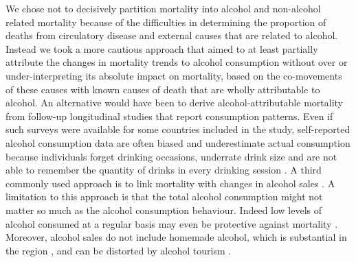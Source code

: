 \documentclass{article}
\begin{document}
\begin{spacing}{1.5}
We chose not to decisively partition mortality into alcohol and non-alcohol related mortality because of the difficulties in determining the proportion of deaths from circulatory disease and external causes that are related to alcohol. Instead we took a more cautious approach that aimed to at least partially attribute the changes in mortality trends to alcohol consumption without over or under-interpreting its absolute impact on mortality, based on the co-movements of these causes with known causes of death that are wholly attributable to alcohol. An alternative would have been to derive alcohol-attributable mortality from follow-up longitudinal studies that report consumption patterns. Even if such surveys were available for some countries included in the study, self-reported alcohol consumption data are often biased and underestimate actual consumption because individuals forget drinking occasions, underrate drink size and are not able to remember the quantity of drinks in every drinking session \citep{livingston2015underreporting,bellis2009off}. A third commonly used approach is to link mortality with changes in alcohol sales \citep{ evgeny2010beverage}. A limitation to this approach is that the total alcohol consumption might not matter so much as the alcohol consumption behaviour. Indeed low levels of alcohol consumed at a regular basis may even be protective against mortality \citep{bell2017,rehm2010relation, klatsky1974alcohol, roerecke2014alcohol}. Moreover, alcohol sales do not include homemade alcohol, which is substantial in the region \citep{popova2007comparing,mckee2005composition}, and can be distorted by alcohol tourism \citep{makela2009weakening,rabinovich2009affordability}. \\


\end{spacing}
\end{document}
